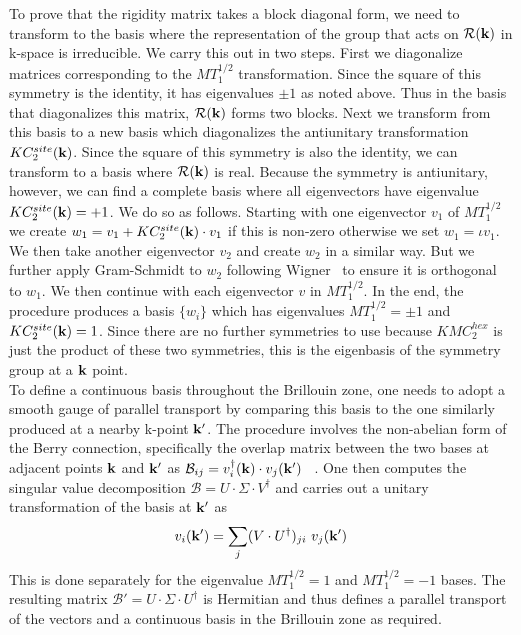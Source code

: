\documentclass[a4paper,aps,prl,floatfix,showpacs,superscriptaddress,notitlepage]{revtex4-1}
\begin{document}
To prove that the rigidity matrix takes a block diagonal form, we need to transform to the basis where the representation of the group that acts on ${\mathcal R}({\bf{k}})$ in k-space is irreducible.
%
We carry this out in two steps. First we diagonalize matrices corresponding to the $MT_1^{1/2}$ transformation. Since the square of this symmetry is the identity, it has eigenvalues $\pm 1$ as noted above. Thus in the basis that diagonalizes this matrix, ${\mathcal R}({\bf{k}})$ forms two blocks. Next we transform from this basis to a new basis which diagonalizes the antiunitary transformation $KC_2^{site}({\bf k})$. Since the square of this symmetry is also the identity, we can transform to a basis where ${\mathcal R}({\bf{k}})$ is real. Because the symmetry is antiunitary, however, we can find a complete basis where all eigenvectors have eigenvalue $KC_2^{site}({\bf k})=+1$.
%
We do so as follows. Starting with one eigenvector $v_1$ of $MT_1^{1/2}$ we create $w_1 = v_1 + KC_2^{site}({\bf k})\cdot v_1$ if this is non-zero otherwise we set $w_1 = \iota v_1$. We then take another eigenvector $v_2$ and create $w_2$ in a similar way. But we further apply Gram-Schmidt to $w_2$ following Wigner~\cite{wigner1960normal} to ensure it is orthogonal to $w_1$. We then continue with each eigenvector $v$ in $MT_1^{1/2}$. In the end, the procedure produces a basis $\{w_i\}$ which has eigenvalues $MT_1^{1/2}=\pm 1$ and $KC_2^{site}({\bf k})=1$. Since there are no further symmetries to use because $KMC_2^{hex}$ is just the product of these two symmetries, this is the eigenbasis of the symmetry group at a ${\bf k}$ point. \\


To define a continuous basis throughout the Brillouin zone, one needs to adopt a smooth gauge of parallel transport by comparing this basis to the one similarly produced at a nearby k-point ${\bf k}'$. The procedure involves the non-abelian form of the Berry connection, specifically the overlap matrix between the two bases at adjacent points ${\bf k}$ and ${\bf k}'$ as $\mathcal{B}_{ij} = v_i^\dagger({\bf k})\cdot v_j({\bf k}')$   ~\cite{soluyanov2012smooth}. One then computes the singular value decomposition $\mathcal{B}= U\cdot\Sigma\cdot V^\dagger$ and carries out a unitary transformation of the basis at ${\bf k}'$ as
\begin{equation}
 v_i ({\bf k}') = \sum_j (V\cdot U^\dagger)_{ji}  ~ v_j ({\bf k}') \nonumber
\end{equation}
This is done separately for the eigenvalue $MT_1^{1/2}= 1$ and $MT_1^{1/2}=-1$ bases. The resulting matrix $\mathcal{B}' = U\cdot\Sigma\cdot U^\dagger$ is Hermitian and thus defines a parallel transport of the vectors and a continuous basis in the Brillouin zone as required. \\
\end{document}

